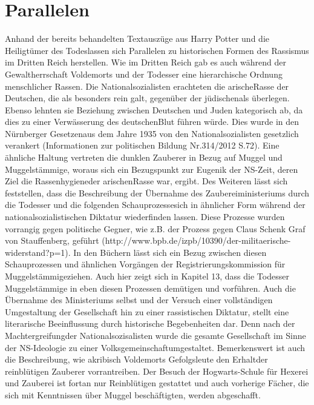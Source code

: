\section {Parallelen}
Anhand der bereits behandelten Textauszüge aus \glqq Harry Potter und die Heiligtümer des Todes\grqq lassen sich Parallelen zu historischen Formen des Rassismus im Dritten Reich herstellen. Wie im Dritten Reich gab es auch während der Gewaltherrschaft Voldemorts und der Todesser eine hierarchische Ordnung menschlicher \glqq Rassen\grqq. 
Die Nationalsozialisten erachteten die \glqq arische\grqq Rasse der Deutschen, die als besonders rein galt, gegenüber der \glqq jüdischen\grqq als überlegen. Ebenso lehnten sie Beziehung zwischen Deutschen und Juden kategorisch ab, da dies zu einer Verwässerung des \glqq deutschen\grqq Blut führen würde. Dies wurde in den \glqq Nürnberger Gesetzen\grqq aus dem Jahre 1935 von den Nationalsozialisten gesetzlich verankert (Informationen zur politischen Bildung Nr.314/2012 S.72). Eine ähnliche Haltung vertreten die dunklen Zauberer in Bezug auf Muggel und Muggelstämmige, woraus sich ein Bezugspunkt zur Eugenik der NS-Zeit, deren Ziel die \glqq Rassenhygiene\grqq der \glqq arischen\grqq Rasse war, ergibt.
Des Weiteren lässt sich feststellen, dass die Beschreibung der Übernahme des Zaubereiministeriums durch die Todesser und die folgenden \glqq Schauprozesse\grqq sich in ähnlicher Form während der nationalsozialistischen Diktatur wiederfinden lassen. Diese Prozesse wurden vorrangig gegen politische Gegner, wie z.B. der Prozess gegen Claus Schenk Graf von Stauffenberg, geführt (http://www.bpb.de/izpb/10390/der-militaerische-widerstand?p=1). In den Büchern lässt sich ein Bezug zwischen diesen Schauprozessen und ähnlichen Vorgängen der \glqq Registrierungskommission für Muggelstämmige\grqq ziehen. Auch hier zeigt sich in Kapitel 13, dass die Todesser Muggelstämmige in eben diesen Prozessen demütigen und vorführen.
Auch die Übernahme des Ministeriums selbst und der Versuch einer  vollständigen Umgestaltung der Gesellschaft hin zu einer rassistischen Diktatur, stellt eine literarische Beeinflussung durch historische Begebenheiten dar. Denn nach der \glqq Machtergreifung\grqq der Nationalsozisalisten wurde die gesamte Gesellschaft im Sinne der NS-Ideologie zu einer \glqq Volksgemeinschaft\grqq umgestaltet. 
Bemerkenswert ist auch die Beschreibung, wie akribisch Voldemorts Gefolgsleute den \glqq Erhalt\grqq der reinblütigen Zauberer vorrantreiben. Der Besuch der Hogwarts-Schule für Hexerei und Zauberei ist fortan nur Reinblütigen gestattet und auch vorherige Fächer, die sich mit Kenntnissen über Muggel beschäftigten, werden abgeschafft. 
